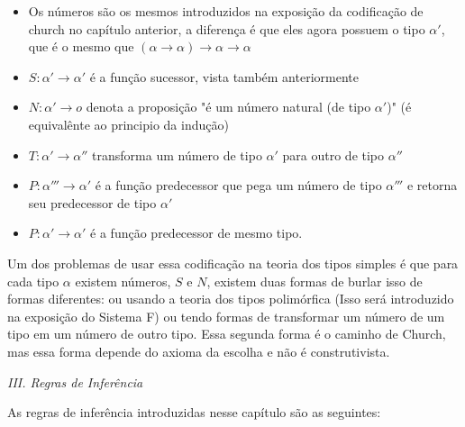\documentclass[../main.tex]{subfiles}
\begin{document}
\begin{itemize}
    \item Os números são os mesmos introduzidos na exposição da codificação de church no capítulo anterior, a diferença é que eles agora possuem o tipo $\alpha'$, que é o mesmo que $(\alpha \to \alpha) \to \alpha \to \alpha$
    \item $S : \alpha' \to \alpha'$ é a função sucessor, vista também anteriormente
    \item $N : \alpha' \to o$ denota a proposição "é um número natural (de tipo $\alpha'$)" (é equivalênte ao principio da indução)
    \item $T : \alpha' \to \alpha''$ transforma um número de tipo $\alpha'$ para outro de tipo $\alpha''$
    \item $P : \alpha''' \to \alpha'$ é a função predecessor que pega um número de tipo $\alpha'''$ e retorna seu predecessor de tipo $\alpha'$
    \item $P : \alpha' \to \alpha'$ é a função predecessor de mesmo tipo.
\end{itemize}

 Um dos problemas de usar essa codificação na teoria dos tipos simples é que para cada tipo $\alpha$ existem números, $S$ e $N$, existem duas formas de burlar isso de formas diferentes: ou usando a teoria dos tipos polimórfica (Isso será introduzido na exposição do Sistema F) ou tendo formas de transformar um número de um tipo em um número de outro tipo. Essa segunda forma é o caminho de Church, mas essa forma depende do axioma da escolha e não é construtivista. 

\emph{III. Regras de Inferência}

As regras de inferência introduzidas nesse capítulo são as seguintes:
\end{document}

